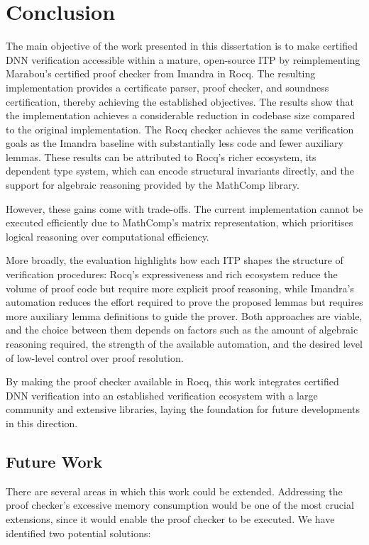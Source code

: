 \section{Conclusion} \label{sec:conclusion}

The main objective of the work presented in this dissertation is to make certified DNN verification accessible within a mature, open-source ITP by reimplementing Marabou's certified proof checker from Imandra in Rocq. The resulting implementation provides a certificate parser, proof checker, and soundness certification, thereby achieving the established objectives. The results show that the implementation achieves a considerable reduction in codebase size compared to the original implementation. The Rocq checker achieves the same verification goals as the Imandra baseline with substantially less code and fewer auxiliary lemmas. These results can be attributed to Rocq's richer ecosystem, its dependent type system, which can encode structural invariants directly, and the support for algebraic reasoning provided by the MathComp library.

However, these gains come with trade-offs. The current implementation cannot be executed efficiently due to MathComp's matrix representation, which prioritises logical reasoning over computational efficiency.

More broadly, the evaluation highlights how each ITP shapes the structure of verification procedures: Rocq's expressiveness and rich ecosystem reduce the volume of proof code but require more explicit proof reasoning, while Imandra's automation reduces the effort required to prove the proposed lemmas but requires more auxiliary lemma definitions to guide the prover. Both approaches are viable, and the choice between them depends on factors such as the amount of algebraic reasoning required, the strength of the available automation, and the desired level of low-level control over proof resolution.

By making the proof checker available in Rocq, this work integrates certified DNN verification into an established verification ecosystem with a large community and extensive libraries, laying the foundation for future developments in this direction.

\subsection{Future Work} \label{sec:future-work}

There are several areas in which this work could be extended. Addressing the proof checker's excessive memory consumption would be one of the most crucial extensions, since it would enable the proof checker to be executed. We have identified two potential solutions:

